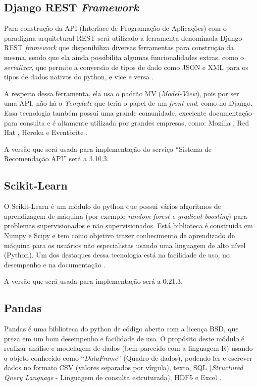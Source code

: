 \subsection{Django REST \textit{Framework}}

Para construção da API (Interface de Programação de Aplicações) com o paradigma arquitetural REST será utilizado a ferramenta denominada Django REST \textit{framework} que disponibiliza diversas ferramentas para construção da mesma, sendo que ela ainda possibilita algumas funcionalidades extras, como o \textit{serializer}, que permite a conversão de tipos de dado como JSON e XML para os tipos de dados nativos do python, e vice e versa \cite{DjangoRest:2019}.

A respeito dessa ferramenta, ela usa o padrão MV (\textit{Model-View}), pois por ser uma API, não há o \textit{Template} que teria o papel de um \textit{front-end}, como no Django. Essa tecnologia também possui uma grande comunidade, excelente documentação para consulta e é altamente utilizada por grandes empresas, como:  Mozilla , Red Hat , Heroku e Eventbrite \cite{DjangoRest:2019}.

A versão que será usada para implementação do serviço “Sistema de Recomendação API” será a 3.10.3.

\subsection{Scikit-Learn}
\label{scikit_learn}

O Scikit-Learn é um módulo do python que possui vários algoritmos de aprendizagem de máquina (por exemplo \textit{random forest e gradient boosting}) para problemas supervisionados e não supervisionados. Está biblioteca é construída em Numpy e Scipy e tem como objetivo trazer conhecimento de aprendizado de máquina para os usuários não especialistas usando uma linguagem de alto nível (Python). Um dos destaques dessa tecnologia está na facilidade de uso, no desempenho e na documentação \cite{PREDEGOSA:2011}.

A versão que será usada para implementação será a 0.21.3.

\subsection{Pandas}

Pandas é uma biblioteca do python de código aberto com a licença BSD, que preza em um bom desempenho e facilidade de uso. O propósito deste módulo é realizar análise e modelagem de dados (bem parecido com a linguagem R) usando o objeto conhecido como “\textit{DataFrame}” (Quadro de dados), podendo ler e escrever dados no formato CSV (valores separados por vírgula), texto, SQL (\textit{Structured Query Language} - Linguagem de consulta estruturada), HDF5 e Excel \cite{pandas:2019}.

